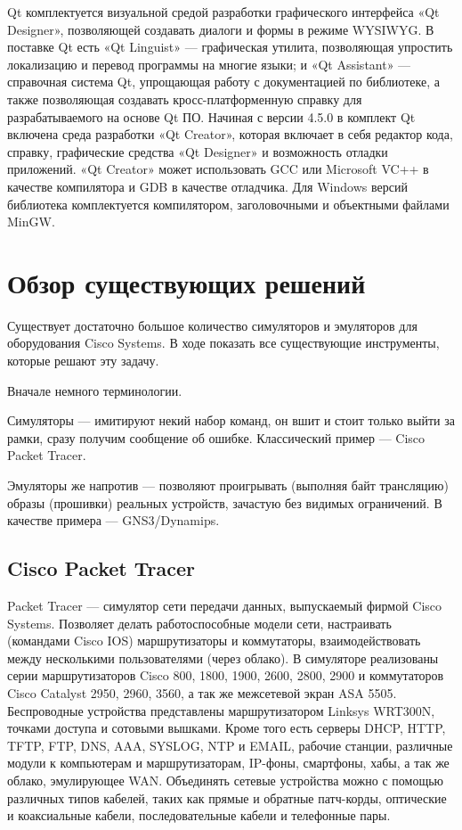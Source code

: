 \documentclass[a4paper,14pt]{extreport}
\begin{document}
	Qt комплектуется визуальной средой разработки графического интерфейса «Qt Designer», позволяющей создавать диалоги и формы в режиме WYSIWYG. В поставке Qt есть «Qt Linguist» — графическая утилита, позволяющая упростить локализацию и перевод программы на многие языки; и «Qt Assistant» — справочная система Qt, упрощающая работу с документацией по библиотеке, а также позволяющая создавать кросс-платформенную справку для разрабатываемого на основе Qt ПО. Начиная с версии 4.5.0 в комплект Qt включена среда разработки «Qt Creator», которая включает в себя редактор кода, справку, графические средства «Qt Designer» и возможность отладки приложений. «Qt Creator» может использовать GCC или Microsoft VC++ в качестве компилятора и GDB в качестве отладчика. Для Windows версий библиотека комплектуется компилятором, заголовочными и объектными файлами MinGW.

	\chapter{Обзор существующих решений}
	
	Существует достаточно большое количество симуляторов и эмуляторов для оборудования Cisco Systems.
	В ходе  показать все существующие инструменты, которые решают эту задачу.
	
	Вначале немного терминологии.
	
	Симуляторы — имитируют некий набор команд, он вшит и стоит только выйти за рамки, сразу получим сообщение об ошибке. Классический пример — Cisco Packet Tracer.
	
	Эмуляторы же напротив — позволяют проигрывать (выполняя байт трансляцию) образы (прошивки) реальных устройств, зачастую без видимых ограничений. В качестве примера — GNS3/Dynamips.
	
	\section{Cisco Packet Tracer}
	
	Packet Tracer — симулятор сети передачи данных, выпускаемый фирмой Cisco Systems. Позволяет делать работоспособные модели сети, настраивать (командами Cisco IOS) маршрутизаторы и коммутаторы, взаимодействовать между несколькими пользователями (через облако). В симуляторе реализованы серии маршрутизаторов Cisco 800, 1800, 1900, 2600, 2800, 2900 и коммутаторов Cisco Catalyst 2950, 2960, 3560, а так же межсетевой экран ASA 5505. Беспроводные устройства представлены маршрутизатором Linksys WRT300N, точками доступа и сотовыми вышками. Кроме того есть серверы DHCP, HTTP, TFTP, FTP, DNS, AAA, SYSLOG, NTP и EMAIL, рабочие станции, различные модули к компьютерам и маршрутизаторам, IP-фоны, смартфоны, хабы, а так же облако, эмулирующее WAN. Объединять сетевые устройства можно с помощью различных типов кабелей, таких как прямые и обратные патч-корды, оптические и коаксиальные кабели, последовательные кабели и телефонные пары.
	
\end{document}
